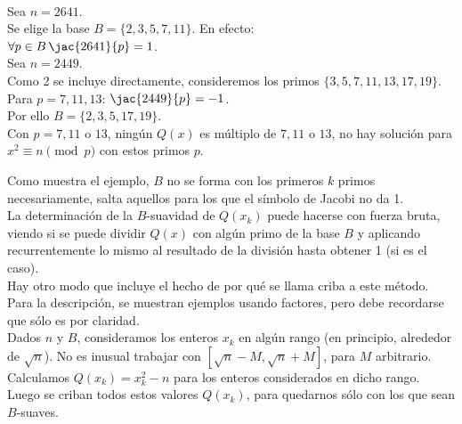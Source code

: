 \begin{ejemplo} \, \\
Sea $n=2641$. \\
Se elige la base $B = \{ 2,3,5,7,11 \}$. En efecto: \\
$\forall p \in B \, \jac{2641}{p}=1$. \\
Sea $n=2449$. \\
Como 2 se incluye directamente, consideremos los primos $\{3,5,7,11,13,17,19\}$. \\
Para $p=7,11,13$: $\jac{2449}{p}=-1$. \\
Por ello $B = \{ 2,3,5,17,19 \}$. \\
Con $p=7,11$ o $13$, ningún $Q(x)$ es múltiplo de $7,11$ o $13$, no hay solución para $x^2 \equiv n \pmod p$ con estos primos $p$.
\end{ejemplo}

Como muestra el ejemplo, $B$ no se forma con los primeros $k$ primos necesariamente, salta aquellos para los que el símbolo de Jacobi no da 1. \\

La determinación de la $B$-suavidad de $Q(x_k)$ puede hacerse con fuerza bruta, viendo si se puede dividir $Q(x)$ con algún primo de la base $B$ y aplicando recurrentemente lo mismo al resultado de la división hasta obtener 1 (si es el caso). \\

Hay otro modo que incluye el hecho de por qué se llama criba a este método.\\
Para la descripción, se muestran ejemplos usando factores, pero debe recordarse que sólo es por claridad.  \\

Dados $n$ y $B$, consideramos los enteros $x_k$ en algún rango (en principio, alrededor de $\sqrt n$). No es inusual trabajar con $[\sqrt n - M, \sqrt n + M]$, para $M$ arbitrario.
  \\
Calculamos $Q(x_k) =  x_k^2 - n$ para los enteros considerados en dicho rango. \\
Luego se criban todos estos valores $Q(x_k)$, para quedarnos sólo con los que sean $B$-suaves.  


